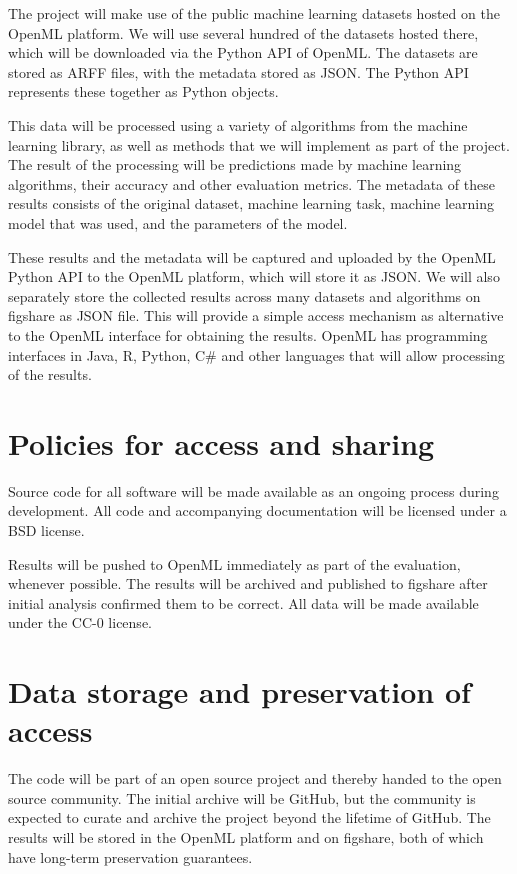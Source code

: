 The project will make use of the public machine learning datasets hosted on the
OpenML platform. We will use several hundred of the datasets hosted there, which will
be downloaded via the Python API of OpenML\@. The datasets are stored as ARFF
files, with the metadata stored as JSON\@. The Python API represents these
together as Python objects.

This data will be processed using a variety of algorithms from the \sklearn{}
machine learning library, as well as methods that we will implement as part of
the project. The result of the processing will be predictions made by machine
learning algorithms, their accuracy and other evaluation metrics. The
metadata of these results consists of the original dataset, machine learning
task, machine learning model that was used, and the parameters of the model.

These results and the metadata will be captured and uploaded by the OpenML
Python API to the OpenML platform, which will store it as JSON\@. We will also
separately store the collected results across many datasets and algorithms on
figshare as JSON file. This will provide a simple access mechanism as
alternative to the OpenML interface for obtaining the results. OpenML has
programming interfaces in Java, R, Python, C\# and other languages that will
allow processing of the results.


\section{Policies for access and sharing}

Source code for all software will be made available as an ongoing process
during development. All code and accompanying documentation will be licensed
under a BSD license.

Results will be pushed to OpenML immediately as part of the evaluation,
whenever possible. The results will be archived and published to figshare after
initial analysis confirmed them to be correct.
All data will be made available under the CC-0 license.

\section{Data storage and preservation of access}

The code will be part of an open source project and thereby handed to the open
source community. The initial archive will be GitHub, but the community is
expected to curate and archive the project beyond the lifetime of GitHub.
The results will be stored in the OpenML platform and on figshare, both of
which have long-term preservation guarantees.

